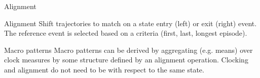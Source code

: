 \documentclass[20pt,usenames,dvipsnames]{beamer}
\begin{document}
\begin{frame}[plain]
\Large
\begin{center}
Alignment
\vspace{1em}
\begin{overlayarea}{\textwidth}{.4\textheight}
\end{overlayarea}
\end{center}
\end{frame}

\begin{frame}[plain]
\Large
 \begin{block}{Alignment}
  Shift trajectories to match on a state entry (left) or exit (right) event. The reference event is selected based on a criteria (first, last, longest episode).
 \end{block}
\end{frame}

%
\begin{frame}[plain]
\Large
\begin{center}
\begin{block}{Macro patterns}
Macro patterns can be derived by aggregating (e.g. means) over clock measures by some structure defined by an alignment operation. Clocking and alignment do not need to be with respect to the same state.
\end{block}
\end{center}
\end{frame}
%
\end{document}
